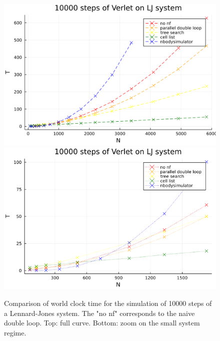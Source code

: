 \begin{figure}[htbp]
    \begin{center}
      \includegraphics[width=0.7\linewidth]{figures/appendix/scaling_comparison_full.png}
      \includegraphics[width=0.7\linewidth]{figures/appendix/scaling_smallN.png}
      \caption{ \label{fig:linear_scaling}
        Comparison of world clock time for the simulation of 10000 steps of a Lennard-Jones system. The "no nf" corresponds to the naive double loop. Top: full curve. Bottom: zoom on the small system regime.
      }
    \end{center}
  \end{figure}


